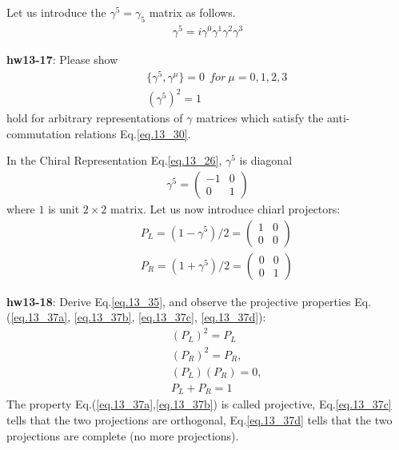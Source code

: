 \documentclass[12pt]{article}
\begin{document}
  Let us introduce the $\gamma^5 = \gamma_5$ matrix as follows.
\begin{eqnarray}
  \gamma^5 = i \gamma^0 \gamma^1 \gamma^2 \gamma^3 \label{eq.13_33}
\end{eqnarray}


{\bf hw13-17}: Please show
\begin{eqnarray}
  && \{ \gamma^5, \gamma^\mu \} = 0~~   for~\mu=0,1,2,3 \label{eq.13_34a} \\
  &&             (\gamma^5)^2 = 1 \label{eq.13_34b}
\end{eqnarray}
  hold for arbitrary representations of $\gamma$ matrices which satisfy the
  anti-commutation relations Eq.\ref{eq.13_30}.

In the Chiral Representation Eq.\ref{eq.13_26}, $\gamma^5$ is diagonal
\begin{eqnarray}
  \gamma^5=
  \begin{pmatrix}
    -1 & 0\\ 
    0 & 1
  \end{pmatrix} \label{eq.13_35}
\end{eqnarray}
  where $1$ is unit $2 \times 2$ matrix. Let us now introduce chiarl projectors:
\begin{eqnarray}
 &&P_L = ( 1 - \gamma^5 )/2 = 
 \begin{pmatrix}
   1 & 0 \\ 
   0 & 0
 \end{pmatrix} \label{eq.13_36a} \\
 && P_R = ( 1 + \gamma^5 )/2 =
 \begin{pmatrix}
   0 & 0 \\
   0 & 1
 \end{pmatrix} \label{eq.13_36b}
\end{eqnarray}
 
{\bf hw13-18}: Derive Eq.\ref{eq.13_35}, and observe the projective properties Eq.(\ref{eq.13_37a}, \ref{eq.13_37b}, \ref{eq.13_37c}, \ref{eq.13_37d}):
\begin{eqnarray}
  &&(P_L)^2 = P_L \label{eq.13_37a}\\
  &&(P_R)^2 = P_R,\label{eq.13_37b} \\
  &&(P_L)(P_R) = 0, \label{eq.13_37c} \\
  &&P_L + P_R = 1 \label{eq.13_37d}
\end{eqnarray}
  The property Eq.(\ref{eq.13_37a},\ref{eq.13_37b}) is called projective, Eq.\ref{eq.13_37c} tells that the two
  projections are orthogonal, Eq.\ref{eq.13_37d} tells that the two projections are
  complete (no more projections).
\end{document}
